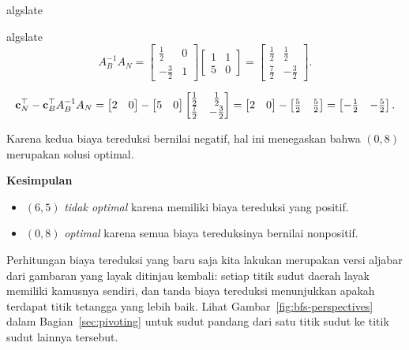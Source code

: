 \begin{solution}
\begin{steppanel}{algslate}
\end{steppanel}
\begin{steppanel}{algslate}
\[
A_B^{-1} A_N =
\begin{bmatrix}
    \tfrac12 & 0 \\
    -\tfrac32 & 1
\end{bmatrix}
\begin{bmatrix}
    1 & 1 \\
    5 & 0
\end{bmatrix}
=
\begin{bmatrix}
    \tfrac12 & \tfrac12 \\
    \tfrac72 & -\tfrac32
\end{bmatrix}.
\]

\[
\mathbf{c}_N^\top -\mathbf{c}_B^\top A_B^{-1} A_N =
\begin{bmatrix}
    2 & 0
\end{bmatrix}
-
\begin{bmatrix}
    5 & 0
\end{bmatrix}
\begin{bmatrix}
    \tfrac12 & \tfrac12 \\
    \tfrac72 & -\tfrac32
\end{bmatrix}
=
\begin{bmatrix}
    2 & 0
\end{bmatrix}
-
\begin{bmatrix}
    \tfrac52 & \tfrac52
\end{bmatrix}
=
\begin{bmatrix}
    -\tfrac12 & -\tfrac52
\end{bmatrix}.
\]
\end{steppanel}
Karena kedua biaya tereduksi bernilai negatif, hal ini menegaskan bahwa $(0,8)$ merupakan solusi optimal.

\textbf{Kesimpulan}
\begin{itemize}
\item \( (6,5) \) \emph{tidak optimal} karena memiliki biaya tereduksi yang positif.
\item \( (0,8) \) \emph{optimal} karena semua biaya tereduksinya bernilai nonpositif.
\end{itemize}
\end{solution}

Perhitungan biaya tereduksi yang baru saja kita lakukan merupakan versi aljabar dari gambaran yang layak ditinjau kembali: setiap titik sudut daerah layak memiliki kamusnya sendiri, dan tanda biaya tereduksi menunjukkan apakah terdapat titik tetangga yang lebih baik.  Lihat Gambar~\ref{fig:bfs-perspectives} dalam Bagian~\ref{sec:pivoting} untuk sudut pandang dari satu titik sudut ke titik sudut lainnya tersebut.

